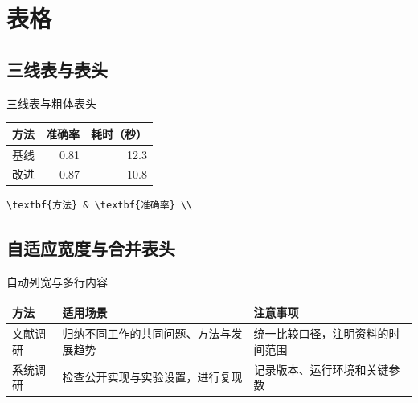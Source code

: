 \section{表格}
\subsection{三线表与表头}
\begin{frame}[fragile]{三线表与粗体表头}
  \begin{tabular}{@{}lrr@{}}
    \toprule
    \textbf{方法} & \textbf{准确率} & \textbf{耗时（秒）} \\
    \midrule
    基线 & 0.81 & 12.3 \\
    改进 & 0.87 & 10.8 \\
    \bottomrule
  \end{tabular}
  \begin{verbatim}
\textbf{方法} & \textbf{准确率} \\
  \end{verbatim}
\end{frame}

\subsection{自适应宽度与合并表头}
\begin{frame}{自动列宽与多行内容}
  \small
  \begin{tabularx}{\linewidth}{@{}lYY@{}}
    \toprule
    \textbf{方法} & \textbf{适用场景} & \textbf{注意事项} \\
    \midrule
    文献调研 & 归纳不同工作的共同问题、方法与发展趋势 & 统一比较口径，注明资料的时间范围 \\
    系统调研 & 检查公开实现与实验设置，进行复现 & 记录版本、运行环境和关键参数 \\
    \bottomrule
  \end{tabularx}
\end{frame}

